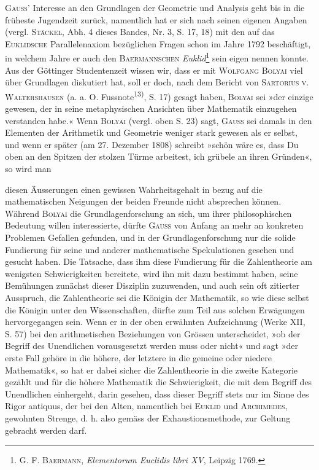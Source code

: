\textsc{Gauss’} Interesse an den Grundlagen der Geometrie und Analysis geht
bis in die früheste Jugendzeit zurück, namentlich hat er sich nach seinen
eigenen Angaben (vergl. \textsc{Stäckel}, Abh. 4 dieses Bandes, Nr. 3, S. 17, 18)
mit den auf das \textsc{Euklidsche} Parallelenaxiom bezüglichen Fragen schon im Jahre
1792 beschäftigt, in welchem Jahre er auch den \textsc{Baermannschen} \textit{Euklid}\footnote{\textsc{G. F. Baermann}, \textit{Elementorum Euclidis libri XV}, Leipzig 1769.} sein
eigen nennen konnte. Aus der Göttinger Studentenzeit wissen wir, dass er
mit \textsc{Wolfgang Bolyai} viel über Grundlagen diskutiert hat, soll er doch,
nach dem Bericht von \textsc{Sartorius v. Waltershausen} (a. a. O. Fussnote\textsuperscript{13)},
S. 17) gesagt haben, \textsc{Bolyai} sei »der einzige gewesen, der in seine metaphysischen
Ansichten über Mathematik einzugehen verstanden habe.« Wenn
\textsc{Bolyai} (vergl. oben S. 23) sagt, \textsc{Gauss} sei damals in den Elementen der Arithmetik
und Geometrie weniger stark gewesen als er selbst, und wenn er später
(am 27. Dezember 1808) schreibt »schön wäre es, dass Du oben an den Spitzen
der stolzen Türme arbeitest, ich grübele an ihren Gründen«, so wird man\par
\clearpage{}
\noindent diesen Äusserungen einen gewissen Wahrheitsgehalt in bezug auf die mathematischen
Neigungen der beiden Freunde nicht absprechen können. Während
\textsc{Bolyai} die Grundlagenforschung an sich, um ihrer philosophischen Bedeutung
willen interessierte, dürfte \textsc{Gauss} von Anfang an mehr an konkreten Problemen
Gefallen gefunden, und in der Grundlagenforschung nur die solide Fundierung
für seine und anderer mathematische Spekulationen gesehen und gesucht haben.
Die Tatsache, dass ihm diese Fundierung für die Zahlentheorie am wenigsten
Schwierigkeiten bereitete, wird ihn mit dazu bestimmt haben, seine Bemühungen
zunächst dieser Disziplin zuzuwenden, und auch sein oft zitierter Ausspruch,
die Zahlentheorie sei die Königin der Mathematik, so wie diese selbst die
Königin unter den Wissenschaften, dürfte zum Teil aus solchen Erwägungen
hervorgegangen sein. Wenn er in der oben erwähnten Aufzeichnung (Werke
XII, S. 57) bei den arithmetischen Beziehungen von Grössen unterscheidet,
»ob der Begriff des Unendlichen vorausgesetzt werden muss oder nicht« und
sagt »der erste Fall gehöre in die höhere, der letztere in die gemeine oder
niedere Mathematik«, so hat er dabei sicher die Zahlentheorie in die zweite
Kategorie gezählt und für die höhere Mathematik die Schwierigkeit, die mit
dem Begriff des Unendlichen einhergeht, darin gesehen, dass dieser Begriff stets
nur im Sinne des Rigor antiquus, der bei den Alten, namentlich bei \textsc{Euklid}
und \textsc{Archimedes}, gewohnten Strenge, d. h. also gemäss der Exhaustionsmethode,
zur Geltung gebracht werden darf.

